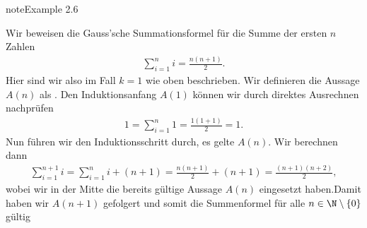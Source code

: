 \documentclass[letterpaper,10pt,english]{jupyterBook}
\begin{document}
\label{grundlagen/zahlensysteme:example-3}
\begin{sphinxadmonition}{note}{Example 2.6}



Wir beweisen die Gauss’sche Summationsformel für die Summe der ersten \(n\) Zahlen
\begin{equation*}
\begin{split}  \sum_{i=1}^n i = \frac{n(n+1)}2.\end{split}
\end{equation*}
Hier sind wir also im Fall \(k=1\) wie oben beschrieben. Wir definieren die Aussage \(A(n)\) als .
Den Induktionsanfang \(A(1)\) können wir durch direktes Ausrechnen nachprüfen
\begin{equation*}
\begin{split}  1 = \sum_{i=1}^n 1 = \frac{1(1+1)}2 = 1.\end{split}
\end{equation*}
Nun führen wir den Induktionsschritt durch, es gelte \(A(n)\). Wir berechnen dann
\begin{equation*}
\begin{split} \sum_{i=1}^{n+1} i = \sum_{i=1}^n i  + (n+1) = \frac{n(n+1)}2 + (n+1) = \frac{(n+1)(n+2)}2,\end{split}
\end{equation*}
wobei wir in der Mitte die bereits gültige Aussage \(A(n)\)  eingesetzt haben.Damit haben wir \(A(n+1)\) gefolgert und somit die Summenformel für alle \(n \in \N \setminus \{0\}\) gültig
\end{sphinxadmonition}
\end{document}

